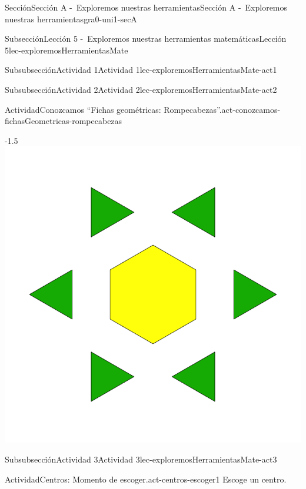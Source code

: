 \documentclass[twoside,10pt,]{article}
\begin{document}
\begin{sectionptx}{Sección}{Sección A -~Exploremos nuestras herramientas}{}{Sección A -~Exploremos nuestras herramientas}{}{}{gra0-uni1-secA}
\begin{subsectionptx}{Subsección}{Lección 5 -~Exploremos nuestras herramientas matemáticas}{}{Lección 5}{}{}{lec-exploremosHerramientasMate}
\begin{subsubsectionptx}{Subsubsección}{Actividad 1}{}{Actividad 1}{}{}{lec-exploremosHerramientasMate-act1}
\end{subsubsectionptx}
%
%
\typeout{************************************************}
\typeout{************************************************}
%
\begin{subsubsectionptx}{Subsubsección}{Actividad 2}{}{Actividad 2}{}{}{lec-exploremosHerramientasMate-act2}
\begin{activity}{Actividad}{Conozcamos “Fichas geométricas: Rompecabezas”.}{act-conozcamos-fichasGeometricas-rompecabezas}%
\begin{image}{0}{1}{0}{-1.5\baselineskip}%
\includegraphics[width=\linewidth]{external/svg-source/tikz-file-148147.pdf}
\end{image}%
\end{activity}%
\end{subsubsectionptx}
%
%
\typeout{************************************************}
\typeout{************************************************}
%
\begin{subsubsectionptx}{Subsubsección}{Actividad 3}{}{Actividad 3}{}{}{lec-exploremosHerramientasMate-act3}
\begin{activity}{Actividad}{Centros: Momento de escoger.}{act-centros-escoger1}%
Escoge un centro.%
\begin{sidebyside}{2}{0.05}{0.05}{0.1}%

\end{sidebyside}
\end{activity}
\end{subsubsectionptx}
\end{subsectionptx}
\end{sectionptx}
\end{document}

